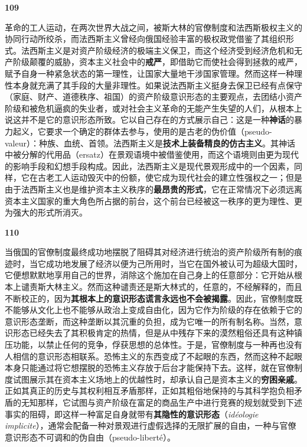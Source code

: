\documentclass[fontset=fandol, a4paper, 12pt, openright]{ctexbook}
\makeatletter
\newcommand{\thesis}[1]{%
    \par\vspace{1.5em}%
    {\centering \textbf{\Large #1}\par}%
    \nobreak\vspace{0.5em}\nobreak
    \@afterindenttrue %
    \@afterheading    %
}
\makeatother
\begin{document}
\thesis{109}
革命的工人运动，在两次世界大战之间，被斯大林的官僚制度和法西斯极权主义的协同行动所绞杀，而法西斯主义曾经向俄国经验丰富的极权政党借鉴了其组织形式。法西斯主义是对资产阶级经济的极端主义保卫，而这个经济受到经济危机和无产阶级颠覆的威胁，资本主义社会中的\textbf{戒严}，即借助它而使社会得到拯救的戒严，赋予自身一种紧急状态的第一理性，让国家大量地干涉国家管理。然而这样一种理性本身就充满了其手段的大量非理性。如果说法西斯主义挺身去保卫已经有点保守（家庭、财产、道德秩序、祖国）的资产阶级意识形态的主要观点，去团结小资产阶级和被危机逼疯的失业者，或对社会主义革命的无能产生失望的人们，从根本上说这并不是它的意识形态所致。它以自己存在的方式展示自己：这是一种\textbf{神话}的暴力起义，它要求一个确定的群体去参与，使用的是古老的伪价值（pseudo-valeur）：种族、血统、首领。法西斯主义是\textbf{技术上装备精良的仿古主义}。其神话中被分解的代用品（ersatz）在景观语境中被借鉴使用，而这个语境则由更为现代的影响手段和幻想手段构成。因此，法西斯主义是现代景观形成中的一个因素，同样，它在古老工人运动毁灭中的份额，使它成为现代社会的建立性强权之一；但是由于法西斯主义也是维护资本主义秩序的\textbf{最昂贵的形式}，它在正常情况下必须远离资本主义国家的重大角色所占据的前台，这个前台已经被这一秩序的更为理性、更为强大的形式所消灭。

\thesis{110}
当俄国的官僚制度最终成功地摆脱了阻碍其对经济进行统治的资产阶级所有制的痕迹时，当它成功地发展了经济以便为己所用时，当它在国外被认可为超级大国时，它便想默默地享用自己的世界，消除这个施加在自己身上的任意部分：它开始从根本上谴责斯大林主义。然而这种谴责还是斯大林式的，任意的，不经解释的，而且不断校正的，因为\textbf{其根本上的意识形态谎言永远也不会被揭露}。因此，官僚制度既不能够从文化上也不能够从政治上变成自由化，因为它作为阶级的存在依赖于它的意识形态垄断，而这种垄断以其沉重的负担，成为它唯一的所有制名称。当然，意识形态已经失去了其积极肯定的热情，但是从中残存下来的漠然粗俗还具有这种镇压功能，以禁止任何的竞争，俘获思想的总体性。于是，官僚制度与一种再也没有人相信的意识形态相联系。恐怖主义的东西变成了不起眼的东西，然而这种不起眼本身只能通过将它想摆脱的恐怖主义存放于后台才能保持下去。这样，就在官僚制度试图展示其在资本主义场地上的优越性时，却承认自己是资本主义的\textbf{穷困亲戚}。正如其真正的历史与其权利相互矛盾那样，正如其粗俗地保持的与其科学抱负相矛盾的无知那样，它试图与资产阶级在富足的商品生产中进行竞赛的规划就受到下述事实的阻碍，即这样一种富足自身就带有\textbf{其隐性的意识形态}（\textit{idéologie implicite}），通常会配备一种对景观进行虚假选择的无限扩展的自由，一种与官僚意识形态不可调和的伪自由（pseudo-liberté）。
\end{document}
